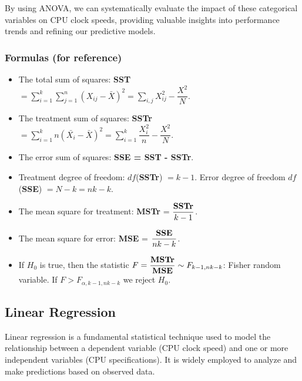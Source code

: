 By using ANOVA, we can systematically evaluate the impact of these categorical variables on CPU clock speeds, providing valuable insights into performance trends and refining our predictive models.\\

\subsubsection{Formulas (for reference)}
\begin{itemize}
\item The total sum of squares: \textbf{SST} $ = \sum_{i=1}^{k}\sum_{j = 1}^{n} (X_{ij} - \bar{X})^2 = \sum_{i,j}X^2_{ij} - \dfrac{X^2}{N} $.
\item The treatment sum of squares: \textbf{SSTr} $ = \sum_{i=1}^{k} n (\bar{X_i} - \bar{X})^2 = \sum_{i=1}^{k} \dfrac{X_i^2}{n} - \dfrac{X^2}{N} $.
\item The error sum of squares: \textbf{SSE = SST - SSTr}.
\item Treatment degree of freedom: $df$(\textbf{SSTr}) $= k-1$. Error degree of freedom $df$(\textbf{SSE}) $= N-k = nk-k$.
\item The mean square for treatment: \textbf{MSTr} = $ \dfrac{\text{\textbf{SSTr}}}{k-1} $.
\item The mean square for error: \textbf{MSE} = $ \dfrac{\text{\textbf{SSE}}}{nk-k} $.
\item If $H_0$ is true, then the statistic $F = \dfrac{\text{\textbf{MSTr}}}{\text{\textbf{MSE}}} \sim F_{k-1,nk-k}$: Fisher random variable. If $ F > F_{\alpha, k-1, nk-k} $ we reject $H_0$.
\end{itemize}

\subsection{Linear Regression}
Linear regression is a fundamental statistical technique used to model the relationship between a dependent variable (CPU clock speed) and one or more independent variables (CPU specifications). It is widely employed to analyze and make predictions based on observed data.\\

